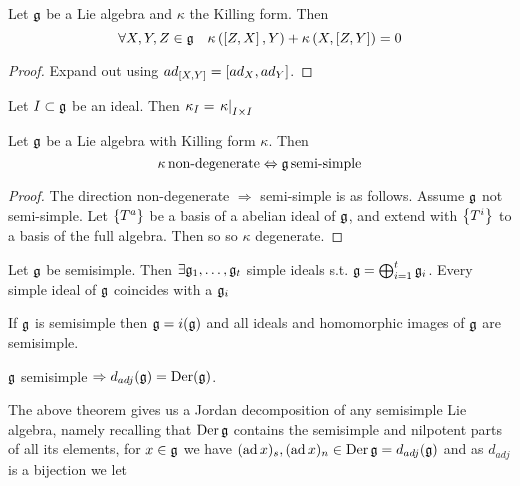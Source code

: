 \documentclass{article}
\begin{document}
\begin{theorem}
	Let $\mf{g}$ be a Lie algebra and $\kappa$ the Killing form. Then
	\[
	\forall X,Y,Z\in\mf{g} \quad \kappa\left(\comm[Z]{X},Y\right)+\kappa\left(X,\comm[Z]{Y}\right)=0
	\]
\end{theorem}
\begin{proof}
	Expand out using $ad_{\comm[X]{Y}} = \comm[ad_X]{ad_Y}$. 
\end{proof}

\begin{lemma}
	Let $I \subset \mf{g}$ be an ideal. Then $\kappa_I = \ev{\kappa}{I \times I}$
\end{lemma}

\begin{theorem}[Cartan]
	Let $\mf{g}$ be a Lie algebra with Killing form $\kappa$. Then 
	\[
	\kappa \, \text{non-degenerate} \Leftrightarrow \mf{g} \, \text{semi-simple}
	\]
\end{theorem}
\begin{proof}
	The direction non-degenerate $\Rightarrow$ semi-simple is as follows. Assume $\mf{g}$ not semi-simple. Let $\pbrace{T^a}$ be a basis of a abelian ideal of $\mf{g}$, and extend with $\pbrace{T^i}$ to a basis of the full algebra. Then
	so
	so $\kappa$ degenerate. 
\end{proof}

\begin{theorem}
	Let $\mf{g}$ be semisimple. Then $\exists \mf{g}_1, \dots, \mf{g}_t$ simple ideals s.t. $\mf{g} = \bigoplus_{i=1}^t \mf{g}_i$. Every simple ideal of $\mf{g}$ coincides with a $\mf{g}_i$
\end{theorem}
\begin{corollary}
	If $\mf{g}$ is semisimple then $\mf{g} = i(\mf{g})$ and all ideals and homomorphic images of $\mf{g}$ are semisimple. 
\end{corollary}

\begin{theorem}
	$\mf{g}$ semisimple $\Rightarrow d_{adj}(\mf{g}) = \Der(\mf{g})$. 
\end{theorem}

\begin{remark}
	The above theorem gives us a Jordan decomposition of any semisimple Lie algebra, namely recalling that $\Der \mf{g}$ contains the semisimple and nilpotent parts of all its elements, for $x \in \mf{g}$ we have $(\ad x)_s, (\ad x)_n \in \Der\mf{g} = d_{adj}(\mf{g})$ and as $d_{adj}$ is a bijection we let 
\end{remark}
\end{document}
